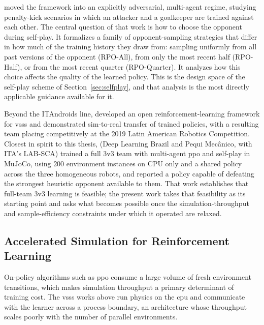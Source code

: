 \textcite{master_thay} moved the framework into an explicitly adversarial,
multi-agent regime, studying penalty-kick scenarios in which an attacker and a
goalkeeper are trained against each other.  The central
question of that work is how to choose the opponent during self-play.  It
formalizes a family of opponent-sampling strategies that differ in how much of
the training history they draw from: sampling uniformly from all
past versions of the opponent (RPO-All), from only the most recent half (RPO-Half), or from the most recent quarter (RPO-Quarter).  It analyzes how this choice affects the quality
of the learned policy.  This is the design space of the self-play scheme of
Section~\ref{sec:selfplay}, and that analysis is the
most directly applicable guidance available for it.

Beyond the ITAndroids line, \textcite{bassani2020} developed an open
reinforcement-learning framework for \gls{vsss} and demonstrated sim-to-real
transfer of trained policies, with a resulting team placing competitively at the
2019 Latin American Robotics Competition.  Closest in spirit
to this thesis, \textcite{brandao2022} (Deep Learning Brazil and Pequi Mec\^anico, with ITA's LAB-SCA) trained a full 3v3 team with multi-agent
\gls{ppo} and self-play in MuJoCo, using $200$ environment instances on CPU only and a shared policy across the three homogeneous
robots, and reported a policy capable
of defeating the strongest heuristic opponent available to them.
That work establishes that full-team 3v3 learning is feasible; the present
work takes that feasibility as its starting point and asks what becomes possible
once the simulation-throughput and sample-efficiency constraints under which it
operated are relaxed.

\subsection{Accelerated Simulation for Reinforcement Learning}

On-policy algorithms such as \gls{ppo} consume a large volume of fresh
environment transitions, which makes simulation throughput a primary determinant
of training cost.  The \gls{vsss} works above run physics on the \gls{cpu} and
communicate with the learner across a process boundary, an architecture whose
throughput scales poorly with the number of parallel environments.


